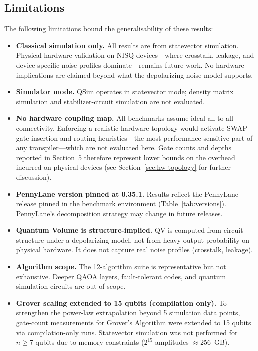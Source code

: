 \subsection{Limitations}

The following limitations bound the generalisability of these results:

\begin{itemize}
  \item \textbf{Classical simulation only.} All results are from
        statevector simulation.
        Physical hardware validation on NISQ devices---where crosstalk,
        leakage, and device-specific noise profiles dominate---remains
        future work.
        No hardware implications are claimed beyond what the depolarizing
        noise model supports.
  \item \textbf{Simulator mode.} QSim operates in statevector mode;
        density matrix simulation and stabilizer-circuit simulation are
        not evaluated.
  \item \textbf{No hardware coupling map.} All benchmarks assume ideal
        all-to-all connectivity.
        Enforcing a realistic hardware topology would activate SWAP-gate
        insertion and routing heuristics---the most performance-sensitive
        part of any transpiler---which are not evaluated here.
        Gate counts and depths reported in Section~5 therefore represent
        lower bounds on the overhead incurred on physical devices
        (see Section~\ref{sec:hw-topology} for further discussion).
  \item \textbf{PennyLane version pinned at 0.35.1.} Results reflect the
        PennyLane release pinned in the benchmark environment
        (Table~\ref{tab:versions}).
        PennyLane's decomposition strategy may change in future releases.
  \item \textbf{Quantum Volume is structure-implied.} QV is computed from
        circuit structure under a depolarizing model, not from
        heavy-output probability on physical hardware.
        It does not capture real noise profiles (crosstalk, leakage).
  \item \textbf{Algorithm scope.} The 12-algorithm suite is
        representative but not exhaustive.
        Deeper QAOA layers, fault-tolerant codes, and quantum simulation
        circuits are out of scope.
  \item \textbf{Grover scaling extended to 15 qubits (compilation only).}
        To strengthen the power-law extrapolation beyond 5 simulation
        data points, gate-count measurements for Grover's Algorithm were
        extended to 15 qubits via compilation-only runs.
        Statevector simulation was not performed for $n \geq 7$ qubits
        due to memory constraints ($2^{15}$ amplitudes $\approx$256~GB).
\end{itemize}

